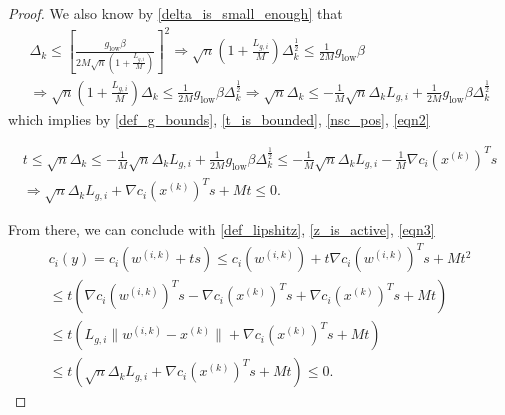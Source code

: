 \documentclass{article}
\theoremstyle{case}
\newcommand{\dk}{\Delta_k}
\newcommand{\xk}{{x^{(k)}}}
\newcommand{\fik}{{\mathcal F_{i, k}}}
\newcommand{\wik}{{w^{(i, k)}}}
\newcommand{\lgi}{{L_{g, i}}}
\begin{document}
\begin{proof}

We also know by \cref{delta_is_small_enough} that
\begin{align}
\dk \le \left[\frac {g_{\text{low}} \beta} {2M\sqrt{n}\left(1 + \frac {\lgi} M \right)} \right]^2 
\Longrightarrow \sqrt{n}\left(1 + \frac {\lgi} M \right) \dk^{\frac 1 2} \le \frac 1 {2M} g_{\text{low}} \beta \nonumber \\
\Longrightarrow \sqrt{n}\left(1 + \frac {\lgi} M \right) \dk \le \frac 1 {2M} g_{\text{low}} \beta \dk^{\frac 1 2}
\Longrightarrow \sqrt{n} \dk \le -\frac 1 M \sqrt{n}\dk \lgi + \frac 1 {2M} g_{\text{low}} \beta \dk^{\frac 1 2} \label{eqn2}
\end{align}
which implies by \cref{def_g_bounds}, \cref{t_is_bounded}, \cref{nsc_pos}, \cref{eqn2}

\begin{align}
t 
\le \sqrt{n} \dk 
\le -\frac 1 M \sqrt{n}\dk \lgi + \frac 1 {2M} g_{\text{low}} \beta \dk^{\frac 1 2} 
\le -\frac 1 M \sqrt{n}\dk \lgi -\frac 1 M \nabla c_i(\xk)^Ts \nonumber \\
\Longrightarrow \sqrt{n}\dk \lgi + \nabla c_i(\xk)^Ts + M t \le 0. \label{eqn3}
\end{align}

From there, we can conclude with \cref{def_lipshitz}, \cref{z_is_active}, \cref{eqn3}
\begin{align*}
c_i(y) = c_i(\wik + ts) \le c_i(\wik) + t\nabla c_i(\wik)^Ts + M t^2 \\
\le t \left(\nabla c_i(\wik)^Ts - \nabla c_i(\xk)^Ts + \nabla c_i(\xk)^Ts + M t\right) \\
\le t \left(\lgi\|\wik - \xk\| + \nabla c_i(\xk)^Ts + M t\right) \\
\le t \left(\sqrt{n}\dk \lgi + \nabla c_i(\xk)^Ts + M t\right) \le 0.
\end{align*}



\end{proof}
\end{document}

